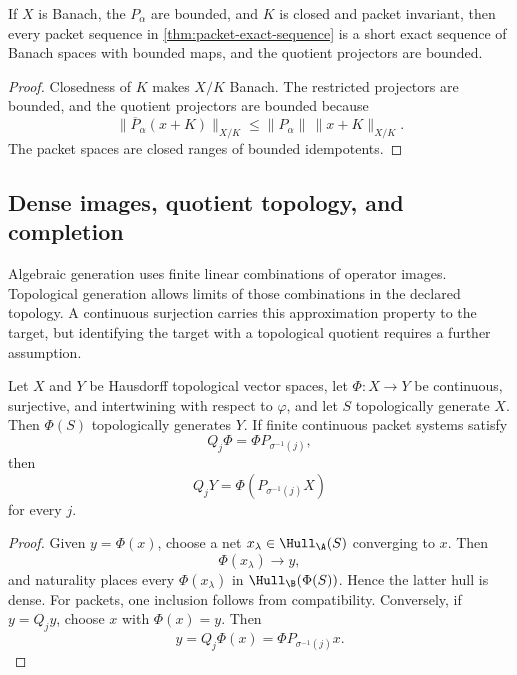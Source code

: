 \begin{corollary}
\label{cor:topological-packet-exact-sequence}
If $X$ is Banach, the $P_\alpha$ are bounded, and $K$ is closed and packet invariant, then every packet sequence in \cref{thm:packet-exact-sequence} is a short exact sequence of Banach spaces with bounded maps, and the quotient projectors are bounded.
\end{corollary}

\begin{proof}
Closedness of $K$ makes $X/K$ Banach.  The restricted projectors are bounded, and the quotient projectors are bounded because
\[
\|\overline P_\alpha(x+K)\|_{X/K}
\leq
\|P_\alpha\|\,\|x+K\|_{X/K}.
\]
The packet spaces are closed ranges of bounded idempotents.
\end{proof}

\subsection{Dense images, quotient topology, and completion}
Algebraic generation uses finite linear combinations of operator images.  Topological generation allows limits of those combinations in the declared topology.  A continuous surjection carries this approximation property to the target, but identifying the target with a topological quotient requires a further assumption.

\begin{theorem}
\label{thm:dense-realization}
Let $X$ and $Y$ be Hausdorff topological vector spaces, let $\Phi:X\to Y$ be continuous, surjective, and intertwining with respect to $\varphi$, and let $S$ topologically generate $X$.  Then $\Phi(S)$ topologically generates $Y$.  If finite continuous packet systems satisfy
\[
Q_j\Phi=\Phi P_{\sigma^{-1}(j)},
\]
then
\[
\boxed{
Q_jY=\Phi(P_{\sigma^{-1}(j)}X)
}
\]
for every $j$.
\end{theorem}

\begin{proof}
Given $y=\Phi(x)$, choose a net $x_\lambda\in\Hull_{\A}(S)$ converging to $x$.  Then
\[
\Phi(x_\lambda)\to y,
\]
and naturality places every $\Phi(x_\lambda)$ in $\Hull_{\B}(\Phi(S))$.  Hence the latter hull is dense.  For packets, one inclusion follows from compatibility.  Conversely, if $y=Q_jy$, choose $x$ with $\Phi(x)=y$.  Then
\[
y=Q_j\Phi(x)=\Phi P_{\sigma^{-1}(j)}x.
\]
\end{proof}

